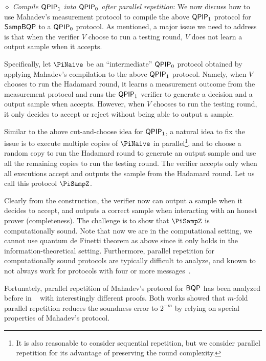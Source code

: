 \vspace{2mm} \noindent  \emph{$\diamond$ Compile $\operatorname{\mathsf{QPIP}}_1$ into $\operatorname{\mathsf{QPIP}}_0$ after parallel repetition}: We now discuss how to use Mahadev's measurement protocol to compile the above $\operatorname{\mathsf{QPIP}}_1$ protocol for $\operatorname{\mathsf{SampBQP}}$ to a $\operatorname{\mathsf{QPIP}}_0$ protocol. As mentioned, a major issue we need to address is that when the verifier $V$ choose to run a testing round, $V$ does not learn a output sample when it accepts.  %

Specifically, let $\PiNaive$ be an ``intermediate'' $\operatorname{\mathsf{QPIP}}_0$ protocol obtained by applying Mahadev's compilation to the above $\operatorname{\mathsf{QPIP}}_1$ protocol. Namely, when $V$ chooses to run the Hadamard round, it learns a measurement outcome from the measurement protocol and runs the $\operatorname{\mathsf{QPIP}}_1$ verifier to generate a decision and a output sample when accepts. However, when  $V$ chooses to run the testing round, it only decides to accept or reject without being able to output a sample. 

Similar to the above cut-and-choose idea for $\operatorname{\mathsf{QPIP}}_1$, a natural idea to fix the issue is to execute multiple copies of $\PiNaive$ in parallel\footnote{It is also reasonable to consider sequential repetition, but we consider parallel repetition for its advantage of preserving the round complexity.}, and to choose a random copy to run the Hadamard round to generate an output sample and use all the remaining copies to run the testing round. The verifier accepts only when all executions accept and outputs the sample from the Hadamard round. Let us call this protocol $\PiSampZ$.

Clearly from the construction, the verifier now can output a sample when it decides to accept, and outputs a correct sample when interacting with an honest prover (completeness). The challenge is to show that $\PiSampZ$ is computationally sound. Note that now we are in the computational setting, we cannot use quantum de Finetti theorem as above since it only holds in the information-theoretical setting. Furthermore, parallel repetition for computationally sound protocols are typically difficult to analyze, and known to not always work for protocols with four or more messages~\cite{BIN97,PW12}.

Fortunately, parallel repetition of Mahadev's protocol for $\operatorname{\mathsf{BQP}}$ has been analyzed before in ~\cite{arXiv:ChiaChungYam19, arXiv:AlaChiHun19} with interestingly different proofs. Both works showed that $m$-fold parallel repetition reduces the soundness error to $2^{-m}$ by relying on special properties of Mahadev's protocol. 

